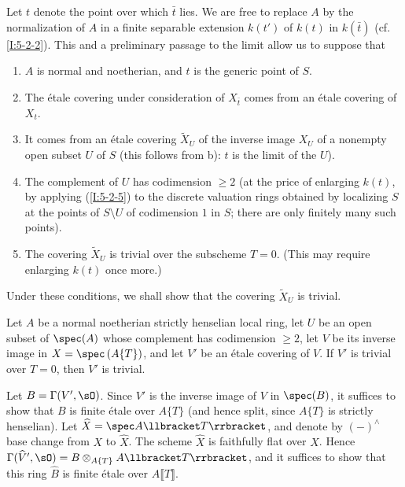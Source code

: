 \documentclass[oneside]{book}
\begin{document}
Let $t$ denote the point over which $\bar t$ lies. We are free to replace
$A$ by the normalization of $A$ in a finite separable extension $k(t')$ of
$k(t)$ in $k(\bar t)$ (cf. \ref{I:5-2-2}). This and a preliminary
passage to the limit allow us to suppose that
\begin{enumerate}[\indent a)]
  \item $A$ is normal and noetherian, and $t$ is the generic point of $S$.
  \item The étale covering under consideration of $X_{\bar t}$ comes from
    an étale covering of $X_t$.
  \item It comes from an étale covering $\widetilde X_U$ of the inverse
    image $X_U$ of a nonempty open subset $U$ of $S$ (this follows from
    b): $t$ is the limit of the $U$).
  \item The complement of $U$ has codimension $\geqslant2$ (at the price
    of enlarging $k(t)$, by applying (\ref{I:5-2-5}) to the discrete
    valuation rings obtained by localizing $S$ at the points of
    $S\setminus U$ of codimension $1$ in $S$; there are only finitely many
    such points).
  \item The covering $\widetilde X_U$ is trivial over the subscheme $T=0$.
    (This may require enlarging $k(t)$ once more.)
\end{enumerate}

Under these conditions, we shall show that the covering
$\widetilde X_U$ is trivial.

\begin{lemma}\label{I:5-2-7} %
Let $A$ be a normal noetherian strictly henselian local ring, let $U$
be an open subset of $\spec(A)$ whose complement has codimension
$\geqslant2$, let $V$ be its inverse image in
$X=\spec\left(A\{T\}\right)$, and let $V'$ be an étale covering of
$V$. If $V'$ is trivial over $T=0$, then $V'$ is trivial.
\end{lemma}

Let $B=\Gamma(V',\sO)$. Since $V'$ is the inverse image of $V$ in
$\spec(B)$, it suffices to show that $B$ is finite étale over $A\{T\}$
(and hence split, since $A\{T\}$ is strictly henselian). Let
$\widehat X=\spec A\llbracket T\rrbracket$, and denote by $(-)^\wedge$ base
change from $X$ to $\widehat X$. The scheme $\widehat X$ is faithfully
flat over $X$. Hence
$\Gamma(\widehat V',\sO)=B\otimes_{A\{T\}}A\llbracket T\rrbracket$,
and it suffices to show that this ring $\widehat B$ is finite étale over
$A\llbracket T\rrbracket$.
\end{document}
